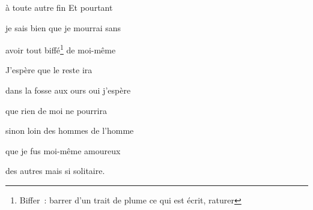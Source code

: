 {à toute autre fin Et pourtant

je sais bien que je mourrai sans

avoir tout biffé\footnote{Biffer~: barrer d'un trait de plume ce qui est écrit, raturer} de moi-même

J'espère que le reste ira

dans la fosse aux ours oui j'espère

que rien de moi ne pourrira

sinon loin des hommes de l'homme

que je fus moi-même amoureux

des autres mais si solitaire.
\setlength{\parskip}{6pt}

}



